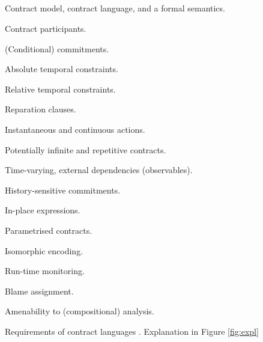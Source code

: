 \documentclass{ituthesis}
\begin{document}
\begin{appendices}

\chapter{}

\begin{figure}[!h]
\begin{tcolorbox}[fontupper=\small]
\begin{list}{(R):~}{}
    \item Contract model, contract language, and a formal semantics.
    \item Contract participants.
    \item (Conditional) commitments.
    \item Absolute temporal constraints.
    \item Relative temporal constraints.
    \item Reparation clauses.
    \item Instantaneous and continuous actions.
    \item Potentially infinite and repetitive contracts.
    \item Time-varying, external dependencies (observables).
    \item History-sensitive commitments.
    \item In-place expressions.
    \item Parametrised contracts.
    \item Isomorphic encoding.
    \item Run-time monitoring.
    \item Blame assignment.
    \item Amenability to (compositional) analysis.
\end{list}
\end{tcolorbox}
\caption{Requirements of contract languages \cite{hvitved2011contract}. Explanation in Figure \ref{fig:expl}}
\label{fig:properties}
\end{figure}


\end{appendices}
\end{document}
